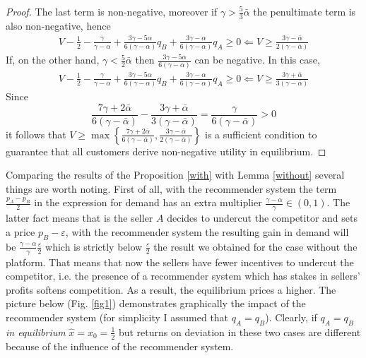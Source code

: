 \documentclass[a4paper]{article}
\begin{document}
\begin{proof}
	 The last term is non-negative, moreover if $\gamma > \frac{5}{3} \bar{\alpha}$ the penultimate term is also non-negative, hence
	 \begin{align*}
	V - \frac{1}{2} - \frac{\gamma}{\gamma-\alpha} + \frac{3 \gamma - 5 \alpha}{6(\gamma - \alpha)}q_B + \frac{3 \gamma - \alpha}{6(\gamma - \alpha)}q_A \ge 0 \Leftarrow V \ge \frac{3 \gamma - \bar{\alpha}}{2(\gamma - \bar{\alpha})}
	 \end{align*}
	 If, on the other hand, $\gamma < \frac{5}{2} \bar{\alpha}$ then $\frac{3 \gamma - 5 \alpha}{6(\gamma - \alpha)}$ can be negative. In this case, 
	 \begin{align*}
	 	V - \frac{1}{2} - \frac{\gamma}{\gamma-\alpha} + \frac{3 \gamma - 5 \alpha}{6(\gamma - \alpha)}q_B + \frac{3 \gamma - \alpha}{6(\gamma - \alpha)}q_A \ge 0 \Leftarrow  V \ge \frac{3 \gamma + \bar{\alpha}}{3(\gamma-\bar{\alpha})}  
	 \end{align*}
	 Since $$\frac{7 \gamma + 2 \bar{\alpha}}{6(\gamma - \bar{\alpha})} - \frac{3 \gamma + \bar{\alpha}}{3(\gamma - \bar{\alpha})} = \frac{\gamma}{6(\gamma - \bar{\alpha})} > 0$$ it follows that $V \ge \max \left\{\frac{7\gamma + 2\bar{\alpha}}{6(\gamma - \bar{\alpha})},  \frac{3 \gamma - \bar{\alpha}}{2(\gamma - \bar{\alpha})} \right\}$ is a sufficient condition to guarantee that all customers derive non-negative utility in equilibrium.
	\end{proof}
Comparing the results of the Proposition \ref{with} with Lemma \ref{without} several things are worth noting. First of all, with the recommender system the term $\frac{p_A-p_B}{2}$ in the expression for demand has an extra multiplier $\frac{\gamma-\alpha}{\gamma} \in (0, 1)$. The latter fact means that is the seller $A$ decides to undercut the competitor and sets a price $p_B - \varepsilon$, with the recommender system the resulting gain in demand will be $\frac{\gamma - \alpha}{\gamma} \frac{\varepsilon}{2}$ which is strictly below $\frac{\varepsilon}{2}$ the result we obtained for the case without the platform. That means that now the sellers have fewer incentives to undercut the competitor, i.e. the presence of a recommender system which has stakes in sellers' profits softens competition. As a result, the equilibrium prices a higher. The picture below (Fig. \ref{fig1}) demonstrates graphically the impact of the recommender system (for simplicity I assumed that $q_A = q_B$). Clearly, if $q_A=q_B$ \textit{in equilibrium} $\hat{x} = x_0 = \frac{1}{2}$ but returns on deviation in these two cases are different because of the influence of the recommender system. 
	
\end{document}
